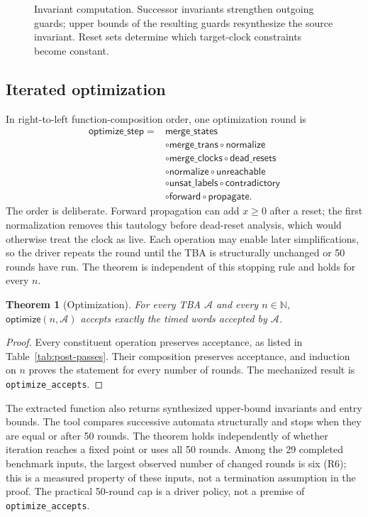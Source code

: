 \documentclass{ieeeaccess}
\providecommand{\Nat}{\mathbb{N}}
\providecommand{\optimize}{\mathsf{optimize}}
\newtheorem{theorem}{Theorem}[section]
\begin{document}
\begin{figure}[t]
\centering

\caption{Invariant computation. Successor invariants strengthen outgoing
guards; upper bounds of the resulting guards resynthesize the source
invariant. Reset sets determine which target-clock constraints become
constant.}
\label{fig:main-inv-unified}
\end{figure}



\subsection{Iterated optimization}
\label{sec:main-pipeline}
In right-to-left function-composition order, one optimization round is
\[
\begin{aligned}
\mathsf{optimize\_step}={}&\mathsf{merge\_states}\\
 &\circ\mathsf{merge\_trans}\circ\mathsf{normalize}\\
 &\circ\mathsf{merge\_clocks}\circ\mathsf{dead\_resets}\\
 &\circ\mathsf{normalize}\circ\mathsf{unreachable}\\
 &\circ\mathsf{unsat\_labels}\circ\mathsf{contradictory}\\
 &\circ\mathsf{forward}\circ\mathsf{propagate}.
\end{aligned}
\]
The order is deliberate. Forward propagation can add $x\ge0$ after a reset;
the first normalization removes this tautology before dead-reset analysis,
which would otherwise treat the clock as live. Each operation may enable
later simplifications, so the driver repeats the round until the TBA is
structurally unchanged or 50 rounds have run. The theorem is independent of
this stopping rule and holds for every $n$.

\begin{theorem}[Optimization]
\label{thm:optimization}
For every TBA $\mathcal A$ and every $n\in\Nat$, $\optimize(n,\mathcal A)$ accepts exactly the timed words accepted by $\mathcal A$.
\end{theorem}
\begin{proof}
Every constituent operation preserves acceptance, as listed in Table~\ref{tab:post-passes}. Their composition preserves acceptance, and induction on $n$ proves the statement for every number of rounds. The mechanized result is \texttt{optimize\_accepts}.
\end{proof}

The extracted function also returns synthesized upper-bound invariants and entry bounds. The tool compares successive automata structurally and stops when they are equal or after 50 rounds. The theorem holds independently of whether iteration reaches a fixed point or uses all 50 rounds. Among the 29 completed benchmark inputs, the largest observed number of changed rounds is six (R6); this is a measured property of these inputs, not a termination assumption in the proof. The practical 50-round cap is a driver policy, not a premise of \texttt{optimize\_accepts}.
\end{document}
